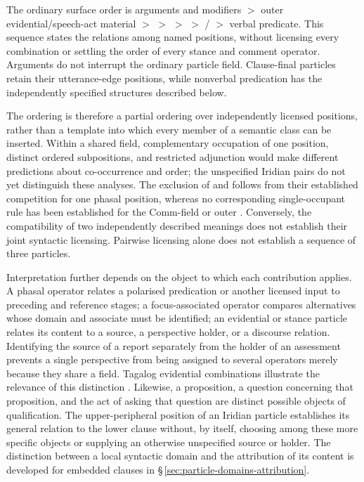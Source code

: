 \noindent The ordinary surface order is arguments and modifiers $>$ outer
 evidential/speech-act material $>$  $>$  $>$ 
 $>$ / $>$ verbal predicate. This sequence states the
 relations among named positions, without licensing every combination or
 settling the order of every stance and comment operator. Arguments do not
 interrupt the ordinary particle field. Clause-final particles retain their
 utterance-edge positions, while nonverbal predication has the independently
 specified structures described below.

The ordering is therefore a partial ordering over independently licensed
positions, rather than a template into which every member of a semantic class
can be inserted. Within a shared field, complementary occupation of one
position, distinct ordered subpositions, and restricted adjunction would make
different predictions about co-occurrence and order; the unspecified Iridian
pairs do not yet distinguish these analyses. The exclusion of 
and  follows from their established competition for one phasal
position, whereas no corresponding single-occupant rule has been established
for the Comm-field or outer . Conversely, the compatibility of
two independently described meanings does not establish their joint syntactic
licensing. Pairwise licensing alone does not establish a sequence of three
particles.

Interpretation further depends on the object to which each contribution
applies. A phasal operator relates a polarised predication or another licensed
input to preceding and reference stages; a focus-associated operator compares
alternatives whose domain and associate must be identified; an evidential or
stance particle relates its content to a source, a perspective holder, or a
discourse relation. Identifying the source of a report separately from the
holder of an assessment prevents a single perspective from being assigned to
several operators merely because they share a field. Tagalog evidential
combinations illustrate the relevance of this distinction
\cite[§3.3.2.2]{tanalmazan2019}. Likewise, a proposition, a
question concerning that proposition, and the act of asking that question
are distinct possible objects of qualification. The upper-peripheral position
of an Iridian particle establishes its general relation to the lower clause
without, by itself, choosing among these more specific objects or supplying
an otherwise unspecified source or holder. The distinction between a local
syntactic domain and the attribution of its content is developed for embedded
clauses in §\,\ref{sec:particle-domains-attribution}.

